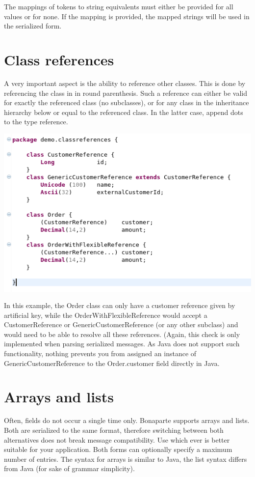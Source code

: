 \documentclass[11pt,a4paper,oneside]{article}
\begin{document}
\noindent The mappings of tokens to string equivalents must either be provided for all values or for none. If the mapping is provided, the
mapped strings will be used in the serialized form.

\section{Class references}
A very important aspect is the ability to reference other classes. This is done by referencing the class in in round parenthesis.
Such a reference can either be valid for exactly the referenced class (no subclasses), or for any class in the inheritance hierarchy below or equal to
 the referenced class. In the latter case, append dots to the type reference.

\vspace{2mm}

\hspace{1cm}\includegraphics[scale=0.5]{images/tut1-014-ref.png}

\noindent In this example, the {\ttfamily Order} class can only have a customer reference given by artificial key, while the {\ttfamily OrderWithFlexibleReference}
would accept a {\ttfamily CustomerReference} or {\ttfamily GenericCustomerReference} (or any other subclass) and would need to be able to resolve all these
references. (Again, this check is only implemented when parsing serialized messages. As Java does not support such functionality, nothing prevents you
from assigned an instance of {\ttfamily GenericCustomerReference}  to the {\ttfamily Order.customer} field directly in Java.

\section{Arrays and lists}
Often, fields do not occur a single time only. Bonaparte supports arrays and lists. Both are serialized to the same format, therefore switching between
both alternatives does not break message compatibility. Use which ever is better suitable for your application.
Both forms can optionally specify a maximum number of entries. 
The syntax for arrays is similar to Java, the list syntax differs from Java (for sake of grammar simplicity).
\end{document}
